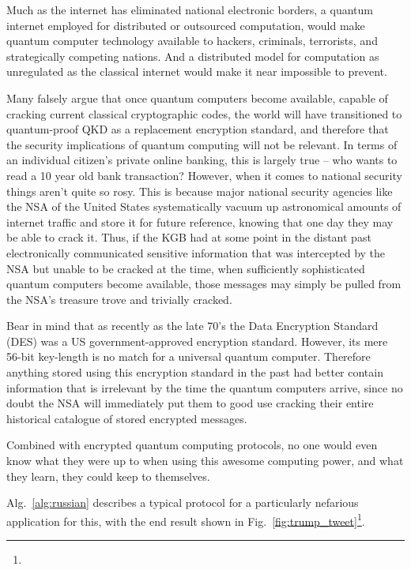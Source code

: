 Much as the internet has eliminated national electronic borders, a quantum internet employed for distributed or outsourced computation, would make quantum computer technology available to hackers, criminals, terrorists, and strategically competing nations. And a distributed model for computation as unregulated as the classical internet would make it near impossible to prevent.

Many falsely argue that once quantum computers become available, capable of cracking current classical cryptographic codes, the world will have transitioned to quantum-proof QKD as a replacement encryption standard, and therefore that the security implications of quantum computing will not be relevant. In terms of an individual citizen's private online banking, this is largely true -- who wants to read a 10 year old bank transaction? However, when it comes to national security things aren't quite so rosy. This is because major national security agencies like the NSA of the United States systematically vacuum up astronomical amounts of internet traffic and store it for future reference, knowing that one day they may be able to crack it. Thus, if the KGB had at some point in the distant past electronically communicated sensitive information that was intercepted by the NSA but unable to be cracked at the time, when sufficiently sophisticated quantum computers become available, those messages may simply be pulled from the NSA's treasure trove and trivially cracked.

Bear in mind that as recently as the late 70's the Data Encryption Standard (DES) was a US government-approved encryption standard. However, its mere 56-bit key-length is no match for a universal quantum computer. Therefore anything stored using this encryption standard in the past had better contain information that is irrelevant by the time the quantum computers arrive, since no doubt the NSA will immediately put them to good use cracking their entire historical catalogue of stored encrypted messages.

Combined with encrypted quantum computing protocols, no one would even know what they were up to when using this awesome computing power, and what they learn, they could keep to themselves.

Alg.~\ref{alg:russian} describes a typical protocol for a particularly nefarious application for this, with the end result shown in Fig.~\ref{fig:trump_tweet}\footnote{}.


